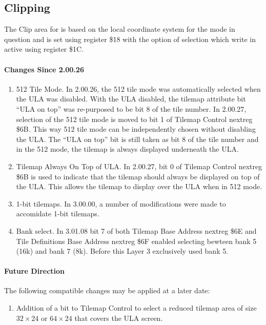 \subsection{Clipping}
The Clip area for is based on the local coordinate system for the mode
in question and is set using register \$18 with the option of
selection which write in active using register \$1C.




\paragraph{Changes Since 2.00.26}

\begin{enumerate}
\item 512 Tile Mode. In 2.00.26, the 512 tile mode was automatically
  selected when the ULA was disabled. With the ULA disabled, the
  tilemap attribute bit “ULA on top” was re-purposed to be bit 8 of
  the tile number. In 2.00.27, selection of the 512 tile mode is moved
  to bit 1 of Tilemap Control nextreg \$6B. This way 512 tile mode can
  be independently chosen without disabling the ULA. The “ULA on top”
  bit is still taken as bit 8 of the tile number and in the 512 mode,
  the tilemap is always displayed underneath the ULA.
\item Tilemap Always On Top of ULA. In 2.00.27, bit 0 of Tilemap
  Control nextreg \$6B is used to indicate that the tilemap should
  always be displayed on top of the ULA. This allows the tilemap to
  display over the ULA when in 512 mode.
\item 1-bit tilemaps. In 3.00.00, a number of modifications were made
  to accomidate 1-bit tilemaps.
\item Bank select. In 3.01.08 bit 7 of both Tilemap Base
  Address nextreg \$6E and Tile Definitions Base Address nextreg \$6F
  enabled selecting bewteen bank 5 (16k) and bank 7 (8k). Before this
  Layer 3 exclusively used bank 5.
\end{enumerate}

\paragraph{Future Direction}

The following compatible changes may be applied at a later date:

\begin{enumerate}
\item Addition of a bit to Tilemap Control to select a reduced tilemap
  area of size $32\times24$ or $64\times24$ that covers the ULA
  screen.
\end{enumerate}
